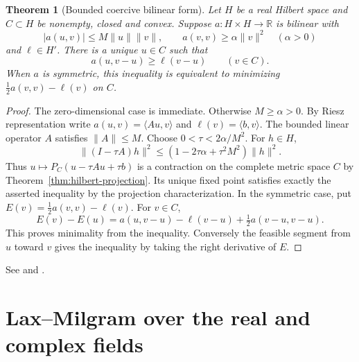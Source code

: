 \documentclass[11pt,oneside,openany]{book}
\theoremstyle{plain}
\newtheorem{theorem}{Theorem}[chapter]
\theoremstyle{definition}
\theoremstyle{remark}
\begin{document}
\begin{theorem}[Bounded coercive bilinear form]
\label{thm:stampacchia}
Let \(H\) be a real Hilbert space and \(C\subset H\) be nonempty, closed
and convex. Suppose \(a:H\times H\to\mathbb R\) is bilinear with
\[
 |a(u,v)|\le M\|u\|\|v\|,\qquad a(v,v)\ge \alpha\|v\|^2
 \quad(\alpha>0)
\]
and \(\ell\in H'\). There is a unique \(u\in C\) such that
\[
 a(u,v-u)\ge\ell(v-u)\qquad(v\in C).
\]
When \(a\) is symmetric, this inequality is equivalent to minimizing
\(\frac12 a(v,v)-\ell(v)\) on \(C\).
\end{theorem}
\begin{proof}
The zero-dimensional case is immediate. Otherwise \(M\ge\alpha>0\).
By Riesz representation write \(a(u,v)=\langle Au,v\rangle\) and
\(\ell(v)=\langle b,v\rangle\). The bounded linear operator \(A\)
satisfies \(\|A\|\le M\). Choose \(0<\tau<2\alpha/M^2\). For \(h\in H\),
\[
 \|(I-\tau A)h\|^2
 \le (1-2\tau\alpha+\tau^2M^2)\|h\|^2 .
\]
Thus \(u\mapsto P_C(u-\tau Au+\tau b)\) is a contraction on the
complete metric space \(C\) by Theorem~\ref{thm:hilbert-projection}.
Its unique fixed point satisfies exactly the asserted inequality by
the projection characterization. In the symmetric case, put
\(E(v)=\frac12 a(v,v)-\ell(v)\). For \(v\in C\),
\[
 E(v)-E(u)=a(u,v-u)-\ell(v-u)+\tfrac12 a(v-u,v-u).
\]
This proves minimality from the inequality. Conversely the feasible
segment from \(u\) toward \(v\) gives the inequality by taking the
right derivative of \(E\).
\end{proof}

See \cite[Theorem 5.6]{Brezis} and
\cite[Chapter II, Section 3]{EkelandTemam}.

\section{Lax--Milgram over the real and complex fields}
\label{v03-07}
\end{document}
